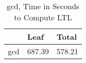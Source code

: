 \begin{table}
\centering
\caption{gcd, Time in Seconds to Compute LTL}
\label{gcd_LTL_time}
\begin{tabular}{lll}
\toprule
{} &    Leaf &   Total \\
\midrule
gcd &  687.39 &  578.21 \\
\bottomrule
\end{tabular}
\end{table}
